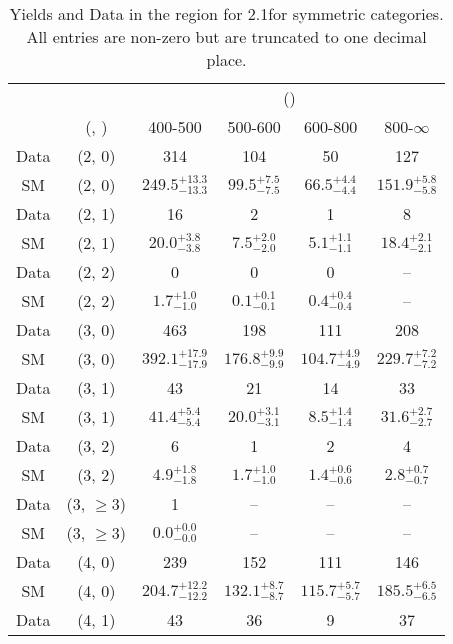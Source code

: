 \begin{table}[h!]
\tiny
\centering
\caption{Yields and Data in the \gj region for 2.1\ifb for symmetric categories. All entries are non-zero but are truncated to one decimal place.\label{tab:yieldsall_gj_comb_sym}}
\begin{tabular}
{cccccc}
	\hline\hline
	&	& \multicolumn{4}{c}{\scalht (\gev)}\\ 
	&	 (\njet, \nb) & 400-500 & 500-600 & 600-800 & 800-$\infty$ \\ [0.8ex] 
\hline
	Data & (2, 0) & 314 & 104 & 50 & 127 \\[0.5ex] 
	SM & (2, 0) & $249.5^{+ 13.3 }_{- 13.3 }$ & $99.5^{+ 7.5 }_{- 7.5 }$ & $66.5^{+ 4.4 }_{- 4.4 }$ & $151.9^{+ 5.8 }_{- 5.8 }$ \\[0.5ex] 
	Data & (2, 1) & 16 & 2 & 1 & 8 \\[0.5ex] 
	SM & (2, 1) & $20.0^{+ 3.8 }_{- 3.8 }$ & $7.5^{+ 2.0 }_{- 2.0 }$ & $5.1^{+ 1.1 }_{- 1.1 }$ & $18.4^{+ 2.1 }_{- 2.1 }$ \\[0.5ex] 
	Data & (2, 2) & 0 & 0 & 0 & -- \\[0.5ex] 
	SM & (2, 2) & $1.7^{+ 1.0 }_{- 1.0 }$ & $0.1^{+ 0.1 }_{- 0.1 }$ & $0.4^{+ 0.4 }_{- 0.4 }$ & -- \\[0.5ex] 
	Data & (3, 0) & 463 & 198 & 111 & 208 \\[0.5ex] 
	SM & (3, 0) & $392.1^{+ 17.9 }_{- 17.9 }$ & $176.8^{+ 9.9 }_{- 9.9 }$ & $104.7^{+ 4.9 }_{- 4.9 }$ & $229.7^{+ 7.2 }_{- 7.2 }$ \\[0.5ex] 
	Data & (3, 1) & 43 & 21 & 14 & 33 \\[0.5ex] 
	SM & (3, 1) & $41.4^{+ 5.4 }_{- 5.4 }$ & $20.0^{+ 3.1 }_{- 3.1 }$ & $8.5^{+ 1.4 }_{- 1.4 }$ & $31.6^{+ 2.7 }_{- 2.7 }$ \\[0.5ex] 
	Data & (3, 2) & 6 & 1 & 2 & 4 \\[0.5ex] 
	SM & (3, 2) & $4.9^{+ 1.8 }_{- 1.8 }$ & $1.7^{+ 1.0 }_{- 1.0 }$ & $1.4^{+ 0.6 }_{- 0.6 }$ & $2.8^{+ 0.7 }_{- 0.7 }$ \\[0.5ex] 
	Data & (3, $\ge3$) & 1 & -- & -- & -- \\[0.5ex] 
	SM & (3, $\ge3$) & $0.0^{+ 0.0 }_{- 0.0 }$ & -- & -- & -- \\[0.5ex] 
	Data & (4, 0) & 239 & 152 & 111 & 146 \\[0.5ex] 
	SM & (4, 0) & $204.7^{+ 12.2 }_{- 12.2 }$ & $132.1^{+ 8.7 }_{- 8.7 }$ & $115.7^{+ 5.7 }_{- 5.7 }$ & $185.5^{+ 6.5 }_{- 6.5 }$ \\[0.5ex] 
	Data & (4, 1) & 43 & 36 & 9 & 37 \\[0.5ex] 

\end{tabular}
\end{table}
